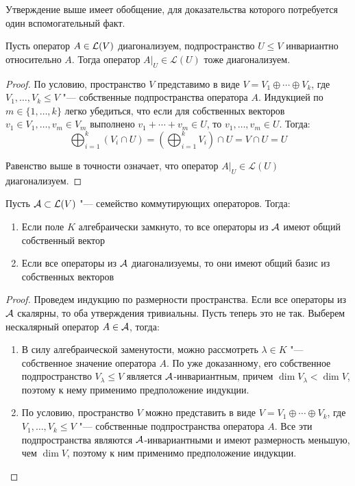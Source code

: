 Утверждение выше имеет обобщение, для доказательства которого потребуется один вспомогательный факт.

\begin{proposition}
	Пусть оператор $A \in \mathcal L(V)$ диагонализуем, подпространство $U \le V$ инвариантно относительно $A$. Тогда оператор $A|_U \in \mathcal L(U)$ тоже диагонализуем.
\end{proposition}

\begin{proof}
	По условию, пространство $V$ представимо в виде $V = V_1 \oplus \dotsb \oplus V_k$, где $V_1, \dotsc, V_k \le V$ "--- собственные подпространства оператора $A$. Индукцией по $m \in \{1, \dotsc, k\}$ легко убедиться, что если для собственных векторов $v_1 \in V_1, \dotsc, v_m \in V_m$ выполнено $v_1 + \dotsb + v_m \in U$, то $v_1, \dotsc, v_m \in U$. Тогда:
	\[\bigoplus_{i = 1}^k(V_i \cap U) = \left(\bigoplus_{i = 1}^kV_i\right) \cap U = V \cap U = U\]
	
	Равенство выше в точности означает, что оператор $A|_U \in \mathcal L(U)$ диагонализуем.
\end{proof}

\begin{theorem}
	Пусть $\mathcal A \subset \mathcal L(V)$ "--- семейство коммутирующих операторов. Тогда:
	\begin{enumerate}
		\item Если поле $K$ алгебраически замкнуто, то все операторы из $\mathcal A$ имеют общий собственный вектор
		\item Если все операторы из $\mathcal A$ диагонализуемы, то они имеют общий базис из собственных векторов
	\end{enumerate}
\end{theorem}

\begin{proof}
	Проведем индукцию по размерности пространства. Если все операторы из $\mathcal A$ скалярны, то оба утверждения тривиальны. Пусть теперь это не так. Выберем нескалярный оператор $A \in \mathcal A$, тогда:
	\begin{enumerate}
		\item В силу алгебраической заменутости, можно рассмотреть $\lambda \in K$ "--- собственное значение оператора $A$. По уже доказанному, его собственное подпространство $V_\lambda \le V$ является $\mathcal A$-инвариантным, причем $\dim{V_\lambda} < \dim{V}$, поэтому к нему применимо предположение индукции.
		\item По условию, пространство $V$ можно представить в виде $V = V_1 \oplus \dotsb \oplus V_k$, где $V_1, \dotsc, V_k \le V$ "--- собственные подпространства оператора $A$. Все эти подпространства являются $\mathcal A$-инвариантными и имеют размерность меньшую, чем $\dim{V}$, поэтому к ним применимо предположение индукции.\qedhere
	\end{enumerate}
\end{proof}